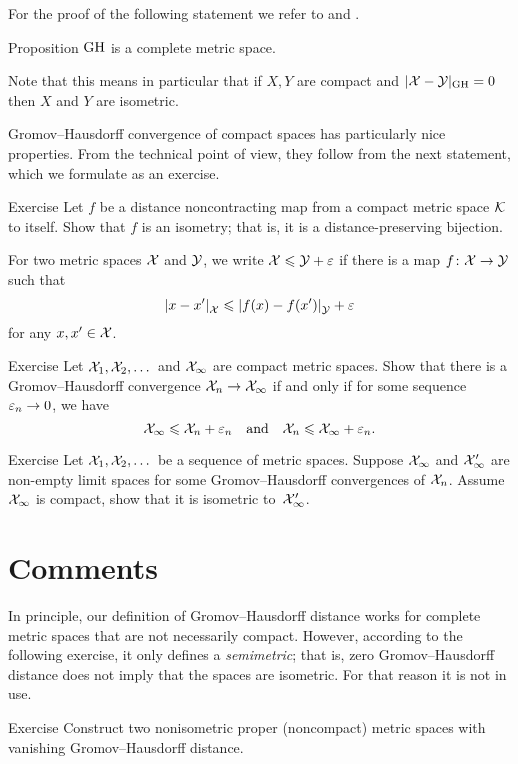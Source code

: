For the proof of the following statement we refer to \cite{burago-burago-ivanov} and \cite{petrunin2023pure}.

\begin{thm}{Proposition}\label{prop:complete}
$\operatorname{\rm GH}\nolimits$ is a complete metric space.
\end{thm}

Note that this means in particular that if $X,Y$ are compact and $|\mathcal{X}-\mathcal{Y}|_{\operatorname{\rm GH}\nolimits}=0$ then $X$ and $Y$ are isometric.

Gromov--Hausdorff convergence of compact spaces has particularly nice properties.
From the technical point of view, they follow from the next statement, which we formulate as an exercise.

\begin{thm}{Exercise}\label{ex:non-contracting-map}
Let $f$ be a distance noncontracting map from 
a compact metric space $\mathcal{K}$ to itself.
Show that $f$ is an isometry; that is, it is a distance-preserving bijection.
\end{thm}

For two metric spaces $\mathcal{X}$ and $\mathcal{Y}$,
we write $\mathcal{X}\leqslant \mathcal{Y}+\varepsilon$ if
there is a map $f\colon\mathcal{X}\to \mathcal{Y}$ such that 
\[|{x}-{x'}|_{\mathcal{X}}^{{}}\leqslant |{f(x)}-{f(x')}|_{\mathcal{Y}}^{{}}+\varepsilon\]
for any $x,x'\in \mathcal{X}$.

\begin{thm}{Exercise}\label{ex:GH-po}
Let $\mathcal{X}_1,\mathcal{X}_2,\dots$ and $\mathcal{X}_\infty$ are compact metric spaces.
Show that there is a Gromov--Hausdorff convergence $\mathcal{X}_n\to\mathcal{X}_\infty$ if and only if for some sequence $\varepsilon_n\to 0$,
we have 
\[\mathcal{X}_\infty\leqslant \mathcal{X}_n+\varepsilon_n\quad\text{and}\quad \mathcal{X}_n\leqslant \mathcal{X}_\infty+\varepsilon_n.\]
\end{thm}

\begin{thm}{Exercise}\label{ex:compact-GH}
Let $\mathcal{X}_1,\mathcal{X}_2,\dots$ be a sequence of metric spaces.
Suppose $\mathcal{X}_\infty$ and $\mathcal{X}_\infty'$ are non-empty limit spaces for some Gromov--Hausdorff convergences of $\mathcal{X}_n$.
Assume $\mathcal{X}_\infty$ is compact, show that it is isometric to~$\mathcal{X}_\infty'$.
\end{thm}

\section{Comments}

In principle, our definition of Gromov--Hausdorff distance works for complete metric spaces that are not necessarily compact.
However, according to the following exercise, it only defines a \emph{semimetric}; that is, zero Gromov--Hausdorff distance does not imply that the spaces are isometric.
For that reason it is not in use.

\begin{thm}{Exercise}\label{ex:GH-noncompact}
Construct two nonisometric proper (noncompact) metric spaces with vanishing Gromov--Hausdorff distance.
\end{thm}
